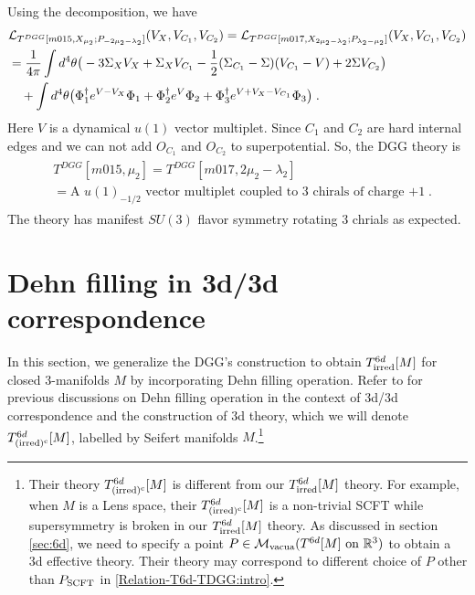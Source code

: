 \documentclass[a4paper,11pt]{article}
\def\CM{{\cal M}}
\begin{document}
%
Using the decomposition, we have 
%
\begin{align}
\begin{split}
&\mathcal{L}_{T^{DGG}[m015, X_{\mu_2};P_{-2\mu_2- \lambda_2}]} (V_X, V_{C_1}, V_{C_2}) = \mathcal{L}_{T^{DGG}[m017, X_{2\mu_2- \lambda_2};P_{\lambda_2 - \mu_2}]} (V_X, V_{C_1}, V_{C_2})
\\
&=  \frac{1}{4\pi }\int d^4\theta \big{(}- 3\Sigma_{X} V_{X} + \Sigma_{X} V_{C_1} -\frac{1}2 (\Sigma_{C_1}- \Sigma)(V_{C_1}-V) +2  \Sigma V_{C_2} \big{)}
\\
& \quad +\int d^4\theta \big{(}\Phi_{1}^\dagger e^{V-V_{X}} \Phi_1+\Phi_{2}^\dagger e^{V} \Phi_2+\Phi_{3}^\dagger e^{V+V_{X}-V_{C_1}} \Phi_3 \big{)}\;. \label{TDGG[m015]}
\end{split}
\end{align}
%
Here $V$ is a dynamical $u(1)$ vector multiplet. Since $C_1$ and $C_2$ are hard internal edges and we can not add $O_{C_1}$ and $O_{C_2}$ to superpotential. 
So, the DGG theory is
%
\begin{align}
\begin{split}
&T^{DGG}[m015,\mu_2] = T^{DGG}[m017,2\mu_2- \lambda_2] 
\\
&=\textrm{A $u(1)_{-1/2}$  vector multiplet coupled to 3 chirals of charge $+1$} \;.
\end{split}
\end{align}
%
The theory has manifest $SU(3)$ flavor symmetry rotating 3 chrials as expected. 





\section{Dehn filling in 3d/3d correspondence}\label{sec : Dehn-filling}




In this section, we generalize the DGG's construction to obtain $T^{6d}_{\rm irred}[M]$ for closed 3-manifolds $M$ by incorporating Dehn filling operation. Refer to \cite{Pei:2015jsa,Gadde:2013sca,Gukov:2017kmk, Alday:2017yxk} for previous discussions on Dehn filling operation in the context of 3d/3d correspondence and the construction of 3d theory, which we will denote $T^{6d}_{(\rm  irred)^c}[M]$, labelled by Seifert manifolds $M$.\footnote{Their theory $T^{6d}_{(\rm  irred)^c}[M]$ is different from  our $T^{6d}_{\rm irred}[M]$ theory. For example, when $M$ is a Lens space, their $T^{6d}_{(\rm  irred)^c}[M]$  is a non-trivial SCFT while  supersymmetry is broken in our $T^{6d}_{\rm  irred}[M]$ theory. As discussed in section~ \ref{sec:6d}, we need to specify a point $P \in \CM_{\rm vacua}(T^{6d}[M] \textrm{ on } \mathbb{R}^3)$ to obtain a 3d effective theory. Their theory may correspond to different choice of $P$ other than $P_{\rm SCFT}$ in \eqref{Relation-T6d-TDGG:intro}.   }  
\end{document}
